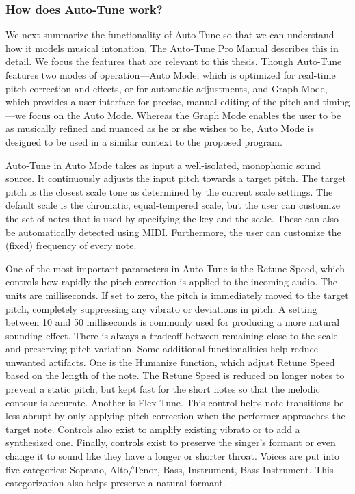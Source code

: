 \subsubsection{How does Auto-Tune work?}
We next summarize the functionality of Auto-Tune so that we can understand how it models musical intonation. The Auto-Tune Pro Manual \cite{antares:2018} describes this in detail. We focus the features that are relevant to this thesis. Though Auto-Tune features two modes of operation---Auto Mode, which is optimized for real-time pitch correction and effects, or for automatic adjustments, and Graph Mode, which provides a user interface for precise, manual editing of the pitch and timing---we focus on the Auto Mode. Whereas the Graph Mode enables the user to be as musically refined and nuanced as he or she wishes to be, Auto Mode is designed to be used in a similar context to the proposed program.   

Auto-Tune in Auto Mode takes as input a well-isolated, monophonic sound source. It continuously adjusts the input pitch towards a target pitch. The target pitch is the closest scale tone as determined by the current scale settings. The default scale is the chromatic, equal-tempered scale, but the user can customize the set of notes that is used by specifying the key and the scale. These can also be automatically detected using MIDI. Furthermore, the user can customize the (fixed) frequency of every note.

One of the most important parameters in Auto-Tune is the Retune Speed, which controls how rapidly the pitch correction is applied to the incoming audio. The units are milliseconds. If set to zero, the pitch is immediately moved to the target pitch, completely suppressing any vibrato or deviations in pitch. A setting between 10 and 50 milliseconds is commonly used for producing a more natural sounding effect. There is always a tradeoff between remaining close to the scale and preserving pitch variation. Some additional functionalities help reduce unwanted artifacts. One is the Humanize function, which adjust Retune Speed based on the length of the note. The Retune Speed is reduced on longer notes to prevent a static pitch, but kept fast for the short notes so that the melodic contour is accurate. Another is Flex-Tune. This control helps note transitions be less abrupt by only applying pitch correction when the performer approaches the target note. Controls also exist to amplify existing vibrato or to add a synthesized one. Finally, controls exist to preserve the singer's formant or even change it to sound like they have a longer or shorter throat. Voices are put into five categories: Soprano, Alto/Tenor, Bass, Instrument, Bass Instrument. This categorization also helps preserve a natural formant. 

